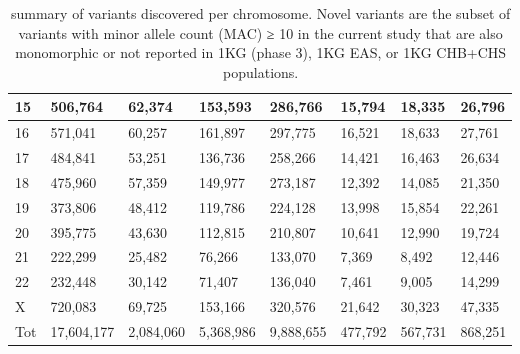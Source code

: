 \begin{table}[!ht]
\begin{tabular}{|l|l|l|l|l|l|l|l|}
        15 & 506,764 & 62,374 & 153,593 & 286,766 & 15,794 & 18,335 & 26,796 \\ \hline
        16 & 571,041 & 60,257 & 161,897 & 297,775 & 16,521 & 18,633 & 27,761 \\ \hline
        17 & 484,841 & 53,251 & 136,736 & 258,266 & 14,421 & 16,463 & 26,634 \\ \hline
        18 & 475,960 & 57,359 & 149,977 & 273,187 & 12,392 & 14,085 & 21,350 \\ \hline
         19 & 373,806 & 48,412 & 119,786 & 224,128 & 13,998 & 15,854 & 22,261 \\ \hline
        20 & 395,775 & 43,630 & 112,815 & 210,807 & 10,641 & 12,990 & 19,724 \\ \hline
        21 & 222,299 & 25,482 & 76,266 & 133,070 & 7,369 & 8,492 & 12,446 \\ \hline
        22 & 232,448 & 30,142 & 71,407 & 136,040 & 7,461 & 9,005 & 14,299 \\ \hline
        X & 720,083 & 69,725 & 153,166 & 320,576 & 21,642 & 30,323 & 47,335 \\ \hline
        Tot & 17,604,177 & 2,084,060 & 5,368,986 & 9,888,655 & 477,792 & 567,731 & 868,251 \\ \hline
    \end{tabular}
    \caption{summary of variants discovered per chromosome. Novel variants are the subset of variants with minor allele count (MAC) ≥ 10 in the current study that are also monomorphic or not reported in 1KG (phase 3), 1KG EAS, or 1KG CHB+CHS populations.}
\label{table:2.3}
\end{table}
